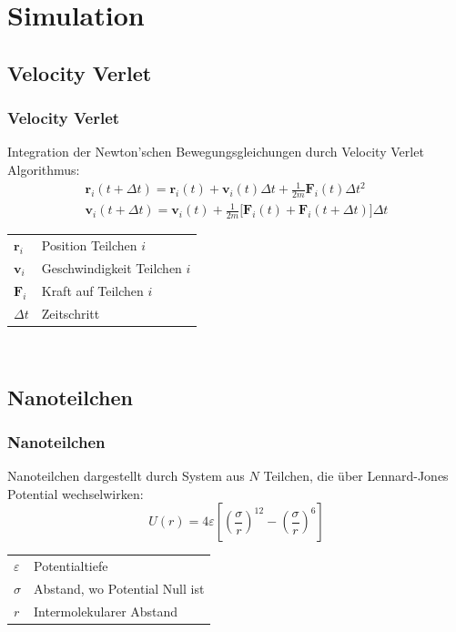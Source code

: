 \documentclass{beamer}
\begin{document}
\section{Simulation}

\subsection{Velocity Verlet}
\begin{frame}
\frametitle{Velocity Verlet}
Integration der Newton'schen Bewegungsgleichungen durch Velocity Verlet Algorithmus:
\begin{equation}
    \label{eq:velocityverlet}
    \begin{aligned}
        \mathbf{r}_i(t+\Delta t) = \mathbf{r}_i(t) + {\mathbf{v}}_i(t) \Delta t + \frac1{2m} {\mathbf{F}}_i(t) \Delta t^2\\
        \mathbf{v}_i(t+\Delta t) = \mathbf{v}_i(t) + \frac1{2m} \Big[\mathbf{F}_i(t) + \mathbf{F}_i(t+\Delta t)\Big] \Delta t
    \end{aligned}
\end{equation}
\begin{tabular}{l l}
$\mathbf{r}_i$ & Position Teilchen $i$\\
$\mathbf{v}_i$ & Geschwindigkeit Teilchen $i$\\
$\mathbf{F}_i$ & Kraft auf Teilchen $i$\\
$\Delta t$ & Zeitschritt\\
\end{tabular}\\
\end{frame}

\subsection{Nanoteilchen}

\begin{frame}
\frametitle{Nanoteilchen}
Nanoteilchen dargestellt durch System aus $N$ Teilchen, die über Lennard-Jones Potential wechselwirken:
\begin{equation}
    \label{eq:lj}
    U(r) = 4\varepsilon\left[\left(\frac\sigma r\right)^{12} - \left(\frac\sigma r\right)^6\right]
\end{equation}
\begin{tabular}{l l}
$\varepsilon$ & Potentialtiefe\\
$\sigma$ & Abstand, wo Potential Null ist\\
$r$ & Intermolekularer Abstand\\
\end{tabular}\\
\end{frame}
\end{document}
